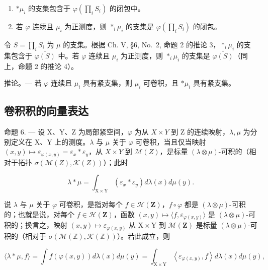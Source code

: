 \begin{enumerate}
\def\labelenumi{\alph{enumi})}
\item
  \(*\mu_i\) 的支集包含于 \(\varphi\left(\prod_{i}S_i\right)\) 的闭包中。
\item
  若 \(\varphi\) 连续且 \(\mu_{i}\) 为正测度，则 \(*_{i} \mu_{i}\) 的支集是 \(\varphi\left(\prod_{i} S_{i}\right)\) 的闭包。
\end{enumerate}

令 \(S = \prod_{i} S_{i}\) 为 \(\mu\) 的支集。根据 Ch. V, §6, No.~2, 命题 2 的推论 3，\(*_{i} \mu_{i}\) 的支集包含于 \(\overline{\varphi(S)}\) 中。若 \(\varphi\) 连续且 \(\mu_{i}\) 为正测度，则 \(*_{i} \mu_{i}\) 的支集是 \(\overline{\varphi(S)}\)（同上，命题 2 的推论 4）。

推论。--- 若 \(\varphi\) 连续且 \(\mu_{i}\) 具有紧支集，则 \(\mu_{i}\) 可卷积，且 \(*\mu_{i}\) 具有紧支集。

\subsection{卷积积的向量表达}

命题 6. --- 设 X、Y、Z 为局部紧空间，\(\varphi\) 为从 \(X \times Y\) 到 Z 的连续映射，\(\lambda, \mu\) 为分别定义在 X、Y 上的测度。\(\lambda\) 与 \(\mu\) 关于 \(\varphi\) 可卷积，当且仅当映射 \((x,y) \mapsto \varepsilon_{\varphi(x,y)} = \varepsilon_x * \varepsilon_y\)，从 \(X \times Y\) 到 \(\mathcal{M}(Z)\)，是标量 \((\lambda \otimes \mu)\)-可积的（相对于拓扑 \(\sigma(\mathcal{M}(Z), \mathcal{K}(Z))\)）；此时

\[
\lambda * \mu = \int_ {\mathrm{X} \times \mathrm{Y}} \left(\varepsilon_ {x} * \varepsilon_ {y}\right) d \lambda (x) d \mu (y).
\]

说 \(\lambda\) 与 \(\mu\) 关于 \(\varphi\) 可卷积，是指对每个 \(f \in \mathcal{H}(\mathbf{Z})\)，\(f \circ \varphi\) 都是 \((\lambda \otimes \mu)\)-可积的；也就是说，对每个 \(f \in \mathcal{H}(\mathbf{Z})\)，函数 \((x,y) \mapsto \langle f, \varepsilon_{\varphi(x,y)} \rangle\) 是 \((\lambda \otimes \mu)\)-可积的；换言之，映射 \((x,y) \mapsto \varepsilon_{\varphi(x,y)}\) 从 \(\mathrm{X} \times \mathrm{Y}\) 到 \(\mathcal{M}(\mathbf{Z})\) 是标量 \((\lambda \otimes \mu)\)-可积的（相对于 \(\sigma (\mathcal{M}(\mathbb{Z}),\mathcal{K}(\mathbb{Z}))\)）。若此成立，则

\[
\langle \lambda * \mu , f \rangle = \int f (\varphi (x, y)) d \lambda (x) d \mu (y) = \int_ {\mathrm{X} \times \mathrm{Y}} \left\langle \varepsilon_ {\varphi (x, y)}, f \right\rangle d \lambda (x) d \mu (y),
\]

